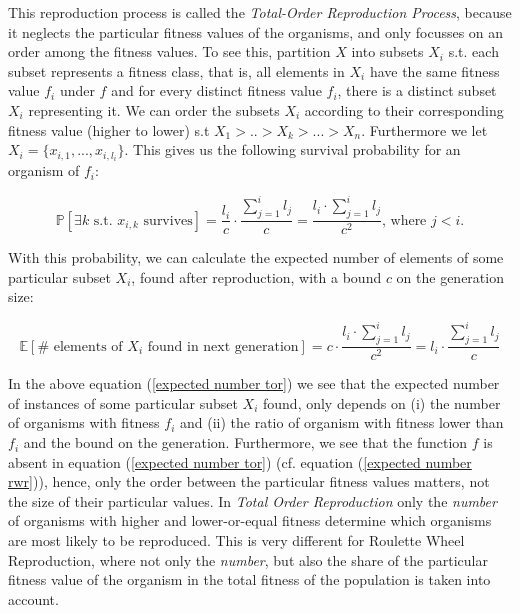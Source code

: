 \documentclass[a4paper]{article}
\newcommand{\Prob}[1]{\mathbb{P}[#1]}
\newcommand{\Expec}[1]{\mathbb{E}[#1]}
\theoremstyle{dotless}
\begin{document}
This reproduction process is called the \textit{Total-Order Reproduction Process}, because it neglects the particular fitness values of the organisms, and only focusses on an order among the fitness values. To see this, partition $X$ into subsets $X_i$ s.t. each subset represents a fitness class, that is, all elements in $X_i$ have the same fitness value $f_i$ under $f$ and for every distinct fitness value $f_i$, there is a distinct subset $X_i$ representing it. We can order the subsets $X_i$ according to their corresponding fitness value (higher to lower) s.t $X_1 > .. > X_k > ... > X_n$. Furthermore we let $X_i = \{ x_{i,1},...,x_{i,l_i} \}$. This gives us the following survival probability for an organism of $f_i$:

\begin{equation}
\Prob{\exists k \text{ s.t. } x_{i,k} \text{ survives}} = \frac{l_i}{c} \cdot \dfrac{\sum^i_{j=1} l_j}{c} = \frac{l_i \cdot \sum^i_{j=1} l_j}{c^2} \text{, where $j<i$.}
\end{equation}

With this probability, we can calculate the expected number of elements of some particular subset $X_i$, found after reproduction, with a bound $c$ on the generation size:

\begin{equation}\label{expected number tor}
\Expec{ \# \text{ elements of } X_i \text{ found in next generation}} = c \cdot \frac{l_i \cdot \sum^i_{j=1} l_j}{c^2} = l_i \cdot \frac{\sum^i_{j=1} l_j}{c}
\end{equation}

In the above equation (\ref{expected number tor}) we see that the expected number of instances of some particular subset $X_i$ found, only depends on (i) the number of organisms with fitness $f_i$ and (ii) the ratio of organism with fitness lower than $f_i$ and the bound on the generation. Furthermore, we see that the function $f$ is absent in equation (\ref{expected number tor}) (cf. equation (\ref{expected number rwr})), hence, only the order between the particular fitness values matters, not the size of their particular values. In \emph{Total Order Reproduction} only the \textit{number} of organisms with higher and lower-or-equal fitness determine which organisms are most likely to be reproduced. This is very different for Roulette Wheel Reproduction, where not only the \textit{number}, but also the share of the particular fitness value of the organism in the total fitness of the population is taken into account.\\ 
\end{document}
